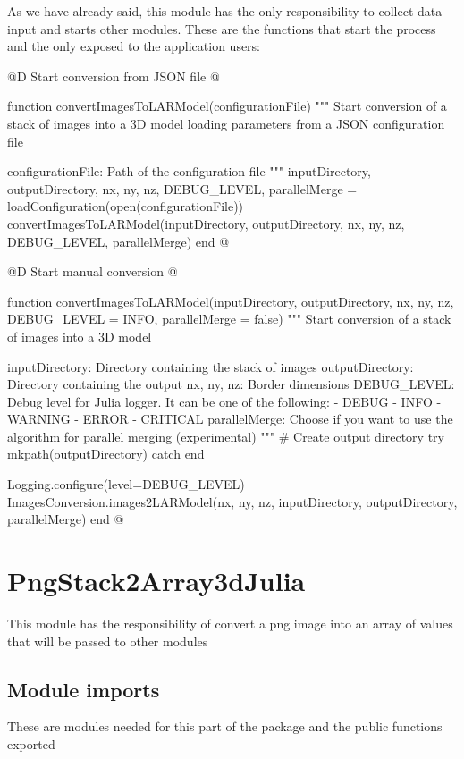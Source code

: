 \documentclass[11pt,oneside]{article}	%
\begin{document}
As we have already said, this module has the only responsibility to collect data input and starts other modules. These are the functions that start the process and the only exposed to the application users:

@D Start conversion from JSON file
@{function convertImagesToLARModel(configurationFile)
  """
  Start conversion of a stack of images into a 3D model
  loading parameters from a JSON configuration file

  configurationFile: Path of the configuration file
  """
  inputDirectory, outputDirectory, nx, ny, nz,
      DEBUG_LEVEL, parallelMerge = loadConfiguration(open(configurationFile))
  convertImagesToLARModel(inputDirectory, outputDirectory,
			nx, ny, nz, DEBUG_LEVEL, parallelMerge)
end
@}

@D Start manual conversion
@{function convertImagesToLARModel(inputDirectory, outputDirectory,
                                 nx, ny, nz, DEBUG_LEVEL = INFO,
                                 parallelMerge = false)
  """
  Start conversion of a stack of images into a 3D model

  inputDirectory: Directory containing the stack of images
  outputDirectory: Directory containing the output
  nx, ny, nz: Border dimensions
  DEBUG_LEVEL: Debug level for Julia logger. It can be one of the following:
    - DEBUG
    - INFO
    - WARNING
    - ERROR
    - CRITICAL
  parallelMerge: Choose if you want to use the algorithm
  for parallel merging (experimental)
  """
  # Create output directory
  try
    mkpath(outputDirectory)
  catch
  end

  Logging.configure(level=DEBUG_LEVEL)
  ImagesConversion.images2LARModel(nx, ny, nz,
	  inputDirectory, outputDirectory, parallelMerge)
end
@}

\section{PngStack2Array3dJulia}\label{sec:PngStack2Array3dJulia}

This module has the responsibility of convert a png image into an array of values
that will be passed to other modules

\subsection{Module imports}\label{sec:imports}
These are modules needed for this part of the package and the public functions exported
\end{document}
